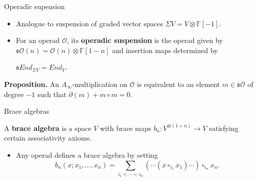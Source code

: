 \documentclass[final]{beamer}
\newlength{\onecolwid}
\begin{document}
\begin{frame}[t]
\begin{columns}[t]
\begin{column}{\onecolwid}
            \begin{block}{Operadic supension}
         \begin{itemize}
             \item Analogue to suspension of graded vector spaces $\Sigma V=V\otimes \mathbb{F}[-1]$.
             \item For an operad $\mathcal{O}$, its \textbf{operadic suspension} is the operad given by $\mathfrak{s}\mathcal{O}(n)=\mathcal{O}(n)\otimes\mathbb{F}[1-n]$ and insertion maps determined by 
             \begin{alertblock}{}
               \hspace{13.5cm}$\mathfrak{s}End_{\Sigma V}=End_V$.
               \vspace{0.4cm}
             \end{alertblock}
         \end{itemize}
         \vspace*{-0.5cm}
          \begin{alertblock}{}
          \textbf{Proposition.} An $A_\infty$-multiplication on $\mathcal{O}$ is equivalent to an element $m\in\mathfrak{s}\mathcal{O}$ of degree $-1$ such that $\partial(m)+m\circ m=0.$ %
         \end{alertblock}
          \end{block}
          
          \begin{block}{Brace algebras}
          
A \textbf{brace algebra} is a space $V$ with brace maps $b_n:V^{\otimes (1+n)}\to V$ satisfying certain associativity axioms.

\begin{itemize}
    \item Any operad defines a brace algebra by setting \[b_n(x;x_1,\dots, x_n)=\sum_{i_1<\cdots<i_n} (\cdots (x\circ_{i_1}x_1)\cdots )\circ_{i_n}x_n.\]
\end{itemize}


\end{block}
\end{column}
\end{columns}
\end{frame}
\end{document}
